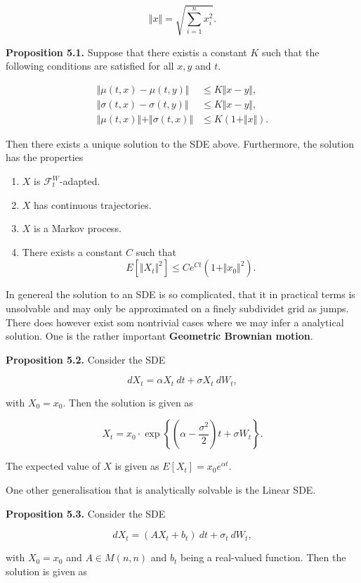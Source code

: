 \documentclass[
]{article}
\providecommand{\tightlist}{%
  \setlength{\itemsep}{0pt}\setlength{\parskip}{0pt}}
\begin{document}
\[
\Vert x\Vert=\sqrt{\sum_{i=1}^nx_i^2}.
\]

\textbf{Proposition 5.1.} Suppose that there existis a constant \(K\)
such that the following conditions are satisfied for all \(x,y\) and
\(t\).

\begin{align*}
\Vert \mu(t,x) - \mu(t,y) \Vert &\le K\Vert x-y\Vert,\\
\Vert \sigma(t,x) - \sigma(t,y) \Vert &\le K\Vert x-y\Vert,\\
\Vert \mu(t,x) \Vert +\Vert \sigma(t,x) \Vert&\le K(1+\Vert x\Vert).
\end{align*}

Then there exists a unique solution to the SDE above. Furthermore, the
solution has the properties

\begin{enumerate}
\def\labelenumi{\arabic{enumi}.}
\tightlist
\item
  \(X\) is \(\mathcal{F}_t^W\)-adapted.
\item
  \(X\) has continuous trajectories.
\item
  \(X\) is a Markov process.
\item
  There exists a constant \(C\) such that \[
    E[\Vert X_t\Vert^2]\le Ce^{Ct}(1+\Vert x_0\Vert^2).
    \]
\end{enumerate}

In genereal the solution to an SDE is so complicated, that it in
practical terms is unsolvable and may only be approximated on a finely
subdividet grid as jumps. There does however exist som nontrivial cases
where we may infer a analytical solution. One is the rather important
\textbf{Geometric Brownian motion}.

\textbf{Proposition 5.2.} Consider the SDE

\[
dX_t=\alpha X_t\ dt+\sigma X_t\ dW_t,
\]

with \(X_0=x_0\). Then the solution is given as

\[
X_t=x_0\cdot \exp\left\{\left(\alpha- \frac{\sigma^2}{2}\right)t+\sigma W_t\right\}.
\]

The expected value of \(X\) is given as \(E[X_t]=x_0e^{\alpha t}\).

One other generalisation that is analytically solvable is the Linear
SDE.

\textbf{Proposition 5.3.} Consider the SDE

\[
dX_t=(A X_t + b_t)\ dt+ \sigma_t\ dW_t,
\]

with \(X_0=x_0\) and \(A\in M(n,n)\) and \(b_t\) being a real-valued
function. Then the solution is given as
\end{document}
